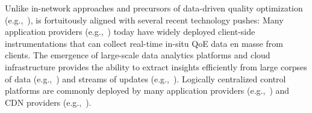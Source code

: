 
Unlike in-network approaches and precursors of data-driven quality optimization 
(e.g.,~\cite{spand}), \ddn 
is fortuitously aligned with several recent  technology pushes:
Many application providers (e.g.,~\cite{sigcomm11,via,akamai-imc12,artizanetworks}) 
today have widely deployed client-side 
instrumentations that can collect real-time in-situ QoE data 
en masse from clients. 
The emergence of large-scale data analytics platforms and cloud infrastructure 
provides the ability to extract insights efficiently from large corpses 
of data (e.g.,~\cite{spark}) and streams of updates 
(e.g.,~\cite{zaharia2013discretized}). 
Logically centralized control platforms are commonly deployed by many 
application providers (e.g.,~\cite{c3,footprint}) and CDN providers (e.g.,~\cite{chen2015end,mukerjee2015practical}).

